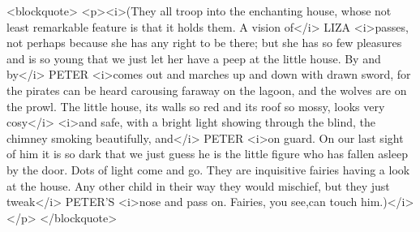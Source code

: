<blockquote> <p><i>(They all troop into the enchanting house, whose not least remarkable feature is that it holds them. A vision of</i> LIZA <i>passes, not perhaps because she has any right to be there; but she has so few pleasures and is so young that we just let her have a peep at the little house. By and by</i> PETER <i>comes out and marches up and down with drawn sword, for the pirates can be heard carousing faraway on the lagoon, and the wolves are on the prowl. The little house, its walls so red and its roof so mossy, looks very cosy</i> <i>and safe, with a bright light showing through the blind, the chimney smoking beautifully, and</i> PETER <i>on guard. On our last sight of him it is so dark that we just guess he is the little figure who has fallen asleep by the door. Dots of light come and go. They are inquisitive fairies having a look at the house. Any other child in their way they would mischief, but they just tweak</i> PETER'S <i>nose and pass on. Fairies, you see,can touch him.)</i></p> </blockquote>
